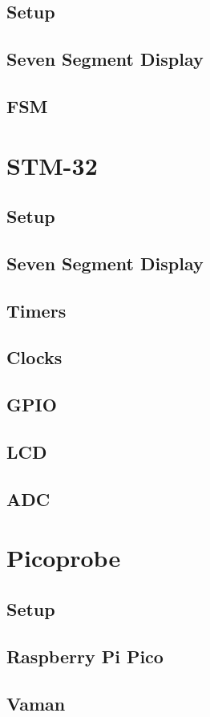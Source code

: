 \documentclass[11pt]{book}
\begin{document}
\section{Setup}

\section{Seven Segment Display}

\section{FSM}

%
\chapter{STM-32}
\section{Setup}

\section{Seven Segment Display}

\section{Timers}

\section{Clocks}

\section{GPIO}

\section{LCD}

\section{ADC}

\chapter{Picoprobe}
\section{Setup}

\section{Raspberry Pi Pico}

\section{Vaman}

\backmatter
\appendix
\iffalse
\chapter{Manual}

\fi


\latexprintindex
\end{document}
